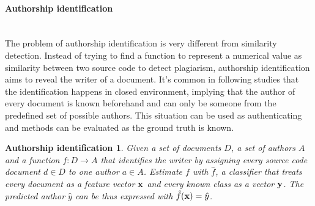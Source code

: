 \paragraph{Authorship identification}\mbox{}\\
The problem of authorship identification is very different from similarity detection. Instead of trying to find a function to represent a numerical value as similarity between two source code to detect plagiarism, authorship identification aims to reveal the writer of a document. It's common in following studies that the identification happens in closed environment, implying that the author of every document is known beforehand and can only be someone from the predefined set of possible authors. This situation can be used as authenticating and methods can be evaluated as the ground truth is known.

\newtheorem*{aui}{Authorship identification}
\begin{aui}
Given a set of documents $D$, a set of authors $A$ and a function $f: D \rightarrow A$ that identifies the writer by assigning every source code document $d \in D$ to one author $a \in A$. Estimate $f$ with $\hat{f}$, a classifier that treats every document as a feature vector $\mathbf{x}$ and every known class as a vector $\mathbf{y}$. The predicted author $\hat{y}$ can be thus expressed with $\hat{f}(\mathbf{x}) = \hat{y}$.
\end{aui}



